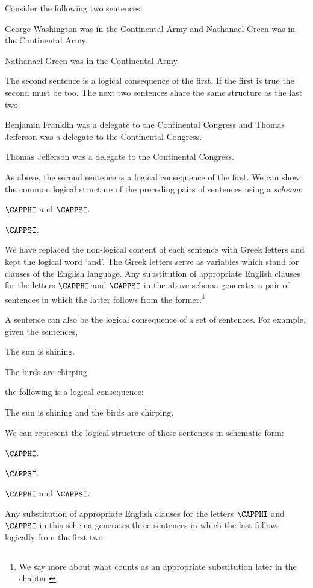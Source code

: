 Consider the following two sentences:
\begin{smenumerate}
	\item George Washington was in the Continental Army and Nathanael Green was in the Continental Army.
	\item Nathanael Green was in the Continental Army.
\end{smenumerate}
The second sentence is a logical consequence of the first. If the first is true the second must be too. The next two sentences share the same structure as the last two:
\begin{menumerate}
	\item Benjamin Franklin was a delegate to the Continental Congress and Thomas Jefferson was a delegate to the Continental Congress.
	\item Thomas Jefferson was a delegate to the Continental Congress.
\end{menumerate}
As above, the second sentence is a logical consequence of the first. We can show the common logical structure of the preceding pairs of sentences using a \emph{schema}:
\begin{menumerate}
	\item $\CAPPHI$ and $\CAPPSI$.
	\item $\CAPPSI$.
\end{menumerate}
We have replaced the non-logical content of each sentence with Greek letters and kept the logical word `and'. The Greek letters serve as variables which stand for clauses of the English language. Any substitution of appropriate English clauses for the letters $\CAPPHI$ and $\CAPPSI$ in the above schema generates a pair of sentences in which the latter follows from the former.\footnote{We say more about what counts as an appropriate substitution later in the chapter.}

A sentence can also be the logical consequence of a set of sentences. For example, given the sentences,
\begin{menumerate}
	\item The sun is shining.
	\item\label{Birds} The birds are chirping.
\end{menumerate}
the following is a logical consequence:
\begin{menumerate}
	\item The sun is shining and the birds are chirping.
\end{menumerate}
We can represent the logical structure of these sentences in schematic form:
\begin{menumerate}
	\item $\CAPPHI$.
	\item $\CAPPSI$.
	\item $\CAPPHI$ and $\CAPPSI$.
\end{menumerate}
Any substitution of appropriate English clauses for the letters $\CAPPHI$ and $\CAPPSI$ in this schema generates three sentences in which the last follows logically from the first two.

